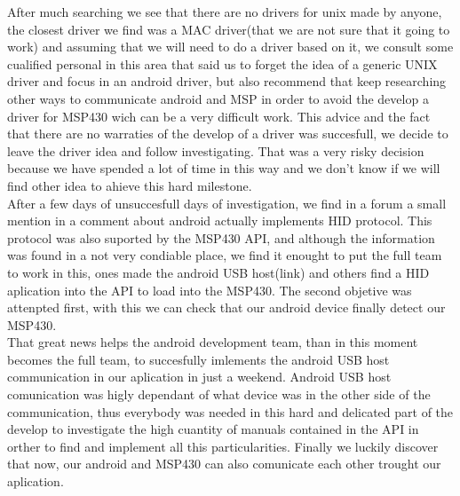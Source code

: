 		After much searching we see that there are no drivers for unix made by anyone, the closest driver we find was a MAC driver(that we are not sure that it going to work) and assuming that we will need to do a driver based on it, we consult some cualified personal in this area that said us to forget the idea of a generic UNIX driver and focus in an android driver, but also recommend that keep researching other ways to communicate android and MSP in order to avoid the develop a driver for MSP430 wich can be a very difficult work. This advice and the fact that there are no warraties of the develop of a driver was succesfull, we decide to leave the driver idea and follow investigating. That was a very risky decision because we have spended a lot of time in this way and we don't know if we will find other idea to ahieve this hard milestone.\\

		After a few days of unsuccesfull days of investigation, we find in a forum a small mention in a comment about android actually implements HID protocol. This protocol was also suported by the MSP430 API, and although the information was found in a not very condiable place, we find it enought to put the full team to work in this, ones made the android USB host(link) and others find a HID aplication into the API to load into the MSP430. The second objetive was attenpted first, with this we can check that our android device finally detect our MSP430. \\

		That great news helps the android development team, than in this moment becomes the full team, to succesfully imlements the android USB host communication in our aplication in just a weekend. Android USB host comunication was higly dependant of what device was in the other side of the communication, thus everybody was needed in this hard and delicated part of the develop to investigate the high cuantity of manuals contained in the API in orther to find and implement all this particularities. Finally we luckily discover that now, our android and MSP430 can also comunicate each other trought our aplication. \\

